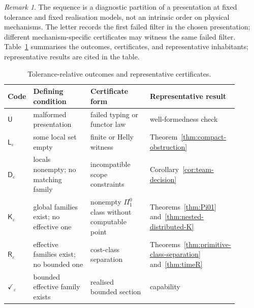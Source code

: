 \documentclass[11pt]{article}
\theoremstyle{plain}
\theoremstyle{definition}
\theoremstyle{remark}
\newtheorem{remark}[theorem]{Remark}
\newcommand{\eps}{\varepsilon}
\begin{document}
\begin{remark}\label{rem:ladder}
The sequence is a diagnostic partition of a presentation at fixed tolerance and
fixed realisation models, not an intrinsic order on physical mechanisms. The
letter records the first failed filter in the chosen presentation; different
mechanism-specific certificates may witness the same failed filter.
Table~\ref{tab:ladder} summarises the outcomes, certificates, and representative inhabitants; representative results are cited in the table.
\end{remark}

\begin{table}[htbp]
\centering
\caption{Tolerance-relative outcomes and representative certificates.}
\label{tab:ladder}
\begin{tabular}{@{}p{0.09\linewidth}p{0.27\linewidth}p{0.28\linewidth}p{0.26\linewidth}@{}}
\toprule
Code & Defining condition & Certificate form & Representative result\\
\midrule
$\mathsf U$ & malformed presentation & failed typing or functor law & well-formedness check\\
$\mathsf L_\eps$ & some local set empty & finite or Helly witness & Theorem~\ref{thm:compact-obstruction}\\
$\mathsf D_\eps$ & locals nonempty; no matching family & incompatible scope constraints & Corollary~\ref{cor:team-decision}\\
$\mathsf K_\eps$ & global families exist; no effective one & nonempty $\Pi^0_1$ class without computable point & Theorems~\ref{thm:Pi01} and~\ref{thm:nested-distributed-K}\\
$\mathsf R_\eps$ & effective families exist; no bounded one & cost-class separation & Theorems~\ref{thm:primitive-class-separation} and~\ref{thm:timeR}\\
$\checkmark_\eps$ & bounded effective family exists & realised bounded section & capability\\
\bottomrule
\end{tabular}
\end{table}
\end{document}
